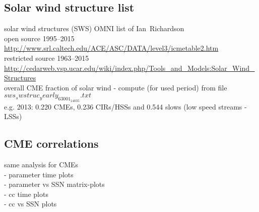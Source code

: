 \subsection{Solar wind structure list}

solar wind structures (SWS) OMNI list of Ian~Richardson \citep{Richardson2012}\\
open source 1995--2015 \url{http://www.srl.caltech.edu/ACE/ASC/DATA/level3/icmetable2.htm}\\
restricted source 1963--2015 \url{http://cedarweb.vsp.ucar.edu/wiki/index.php/Tools_and_Models:Solar_Wind_Structures} \citet{Richardson2012}\\	%

overall CME fraction of solar wind - compute (for used period) from file $sws_swstruc_yearly_63001_14035.txt$\\
e.g. 2013: 0.220 CMEs, 0.236 CIRs/HSSs and 0.544 slows (low speed streams - LSSs)\\

\subsection{CME correlations}

same analysis for CMEs\\
- parameter time plots\\
- parameter vs SSN matrix-plots\\
- cc time plots\\
- cc vs SSN plots\\

